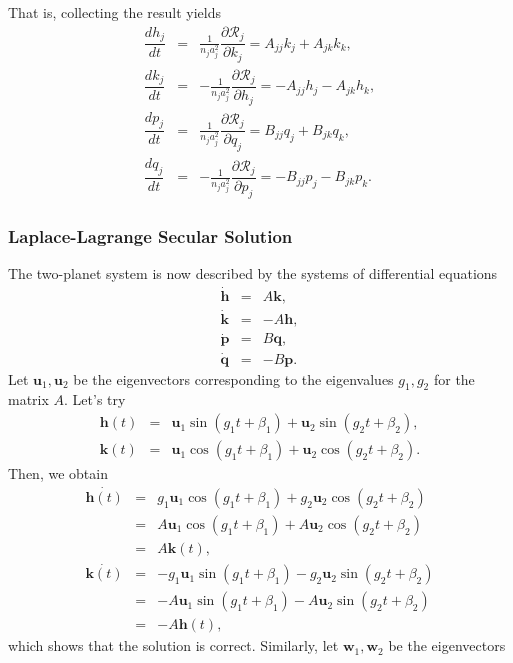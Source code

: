 \documentclass [12pt, a4paper] {article}
\newcommand{\vc}[1]
{
	\boldsymbol{#1}
}
\newcommand{\pdiff}[2]
{
	\dfrac{\partial #1}{\partial #2}
}
\newcommand{\diff}[2]
{
	\dfrac{d #1}{d #2}
}
\begin{document}
That is, collecting the result yields 
\begin {eqnarray}
    \diff{h_j}{t} 
    &=&
    \frac{1}{n_ja_j^2} 
    \pdiff{\mathcal{R}_j}{k_j}
    =
    A_{jj}k_j + A_{jk}k_k
    ,
    \\
    \diff{k_j}{t} 
    &=&
    -\frac{1}{n_ja_j^2} 
    \pdiff{\mathcal{R}_j}{h_j}
    =
    -A_{jj}h_j - A_{jk}h_k
    ,
    \\
    \diff{p_j}{t} 
    &=&
    \frac{1}{n_ja_j^2} 
    \pdiff{\mathcal{R}_j}{q_j}
    =
    B_{jj}q_j + B_{jk}q_k
    ,
    \\
    \diff{q_j}{t} 
    &=&
    -\frac{1}{n_ja_j^2} 
    \pdiff{\mathcal{R}_j}{p_j}
    =
    -B_{jj}p_j - B_{jk}p_k.
\end {eqnarray}
\subsubsection{Laplace-Lagrange Secular Solution}
The two-planet system is now described by the systems of differential equations 
\begin {eqnarray}
    \dot{\vc h} &=& A\vc k, 
    \\
    \dot{\vc k} &=& -A\vc h,
    \\ 
    \dot{\vc p} &=& B\vc q, 
    \\
    \dot{\vc q} &=& -B\vc p.
\end {eqnarray}
Let $\vc u_1, \vc u_2$ be the eigenvectors corresponding to the eigenvalues $g_1, g_2$ for 
the matrix $A$. Let's try
\begin {eqnarray}
    \vc h(t) &=& \vc u_1\sin(g_1t + \beta_1) + \vc u_2\sin(g_2t + \beta_2), \\
    \vc k(t) &=& \vc u_1\cos(g_1t + \beta_1) + \vc u_2\cos(g_2t + \beta_2).
\end {eqnarray}
Then, we obtain
\begin {eqnarray}
    \dot{\vc h(t)} 
    &=& 
    g_1\vc u_1\cos(g_1t + \beta_1) + g_2\vc u_2\cos(g_2t + \beta_2) \\
    &=& 
    A\vc u_1\cos(g_1t + \beta_1) + A\vc u_2\cos(g_2t + \beta_2) \\
    &=& 
    A\vc k(t),
    \\
    \dot{\vc k(t)}
    &=&
    -g_1\vc u_1\sin(g_1t + \beta_1) - g_2\vc u_2\sin(g_2t + \beta_2) \\
    &=&
    -A\vc u_1\sin(g_1t + \beta_1) - A\vc u_2\sin(g_2t + \beta_2) \\
    &=&
    -A\vc h(t),
\end {eqnarray}
which shows that the solution is correct. Similarly, let $\vc w_1, \vc w_2$ be the eigenvectors
\end{document}

